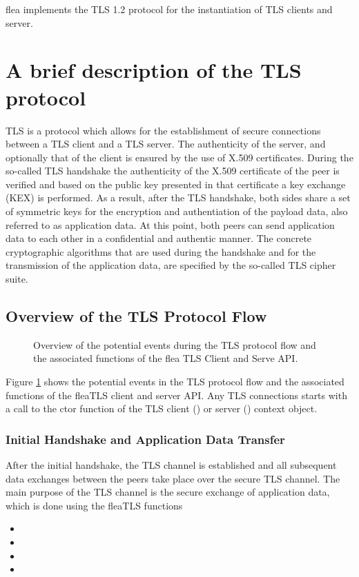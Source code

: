 \documentclass[a4paper,11pt]{scrartcl}
\begin{document}
flea implements the TLS 1.2 protocol for the instantiation of TLS clients and
server. 

\section{A brief description of the TLS protocol}
TLS is a protocol which allows for the establishment of secure connections
between a TLS client and a TLS server. The authenticity of the server, and
optionally that of the client is ensured by the use of X.509 certificates.
During the so-called TLS handshake the authenticity of the X.509 certificate of
the peer is verified and based on the public key presented in that certificate
a key exchange (KEX) is performed. As a result, after the TLS handshake, both
sides share a set of symmetric keys for the encryption and authentiation of the
payload data, also referred to as application data. 
At this point, both peers
can send application data to each other in a confidential and authentic manner.
The concrete cryptographic algorithms that are used during the handshake and for the
transmission of the application data, are specified by the so-called TLS
cipher suite.

\subsection{Overview of the TLS Protocol Flow}
\begin{figure}

\caption{Overview of the potential events during the TLS protocol flow and the
associated functions of the flea TLS Client and Serve API.}
\label{figTlsSeqFlow}
\end{figure}

Figure \ref{figTlsSeqFlow} shows the potential events in the TLS protocol flow
and the associated functions of the fleaTLS client and server API. Any TLS
connections starts with a call to the ctor function of the TLS client
(\clientCtx) or server (\serverCtx) context object.

\subsubsection{Initial Handshake and Application Data Transfer}
After the initial handshake, the TLS channel is established and all subsequent
data exchanges between the peers take place over the secure TLS channel. The
main purpose of the TLS channel is the secure exchange of application data,
which is done using the fleaTLS functions 
\begin{itemize}
  \item {}
\item {}
\item {}
  \item {}
\end{itemize}
\end{document}
